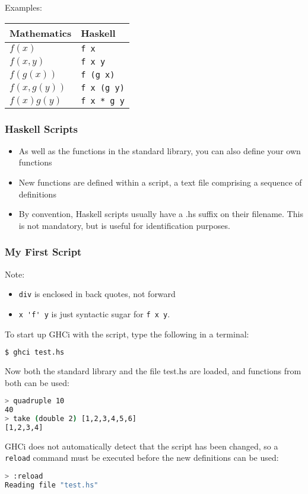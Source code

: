 \begin{multicols}{2}
Examples:\\
\begin{tabularx}{\linewidth}{|X|X|}
\hline
\textbf{Mathematics} & \textbf{Haskell} \\
\hline
$f(x)$ & \lstinline|f x| \\
$f(x,y)$ & \lstinline|f x y| \\
$f(g(x))$ & \lstinline|f (g x)| \\
$f(x,g(y))$ & \lstinline|f x (g y)| \\
$f(x)g(y)$ & \lstinline|f x * g y| \\
\hline
\end{tabularx}

\subsubsection{Haskell Scripts}
\begin{itemize}
  \item As well as the functions in the standard library, you can also define your own functions
  \item New functions are defined within a script, a text file comprising a sequence of definitions
  \item By convention, Haskell scripts usually have a .hs suffix on their filename. This is not mandatory, but is useful for identification purposes.
\end{itemize}

\subsubsection{My First Script}


Note:
\begin{itemize}
  \item \lstinline{div} is enclosed in back quotes, not forward
  \item \lstinline{x 'f' y} is just syntactic sugar for \lstinline{f x y}.
\end{itemize}

To start up GHCi with the script, type the following in a terminal:
\begin{lstlisting}[language=bash]
$ ghci test.hs
\end{lstlisting}
Now both the standard library and the file test.hs are loaded, and functions from both can be used:
\begin{lstlisting}[language=bash]
> quadruple 10
40
> take (double 2) [1,2,3,4,5,6]
[1,2,3,4]
\end{lstlisting}
GHCi does not automatically detect that the script has been changed, so a \lstinline[language=bash]{reload} command must be executed before the new definitions can be used:
\begin{lstlisting}[language=bash]
> :reload
Reading file "test.hs"
\end{lstlisting}


\end{multicols}
